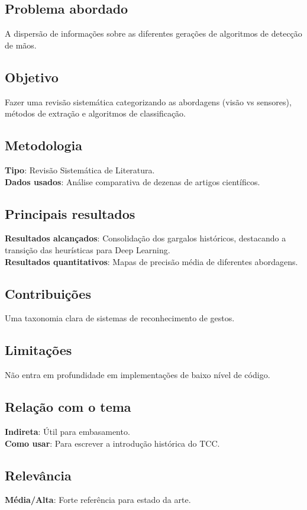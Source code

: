 \documentclass[12pt, a4paper]{article}
\begin{document}
\subsection{Problema abordado}
A dispersão de informações sobre as diferentes gerações de algoritmos de detecção de mãos.\\
\subsection{Objetivo}
Fazer uma revisão sistemática categorizando as abordagens (visão vs sensores), métodos de extração e algoritmos de classificação.\\
\subsection{Metodologia}
\textbf{Tipo}: Revisão Sistemática de Literatura.\\
\textbf{Dados usados}: Análise comparativa de dezenas de artigos científicos.\\
\subsection{Principais resultados}
\textbf{Resultados alcançados}: Consolidação dos gargalos históricos, destacando a transição das heurísticas para Deep Learning.\\
\textbf{Resultados quantitativos}: Mapas de precisão média de diferentes abordagens.\\
\subsection{Contribuições}
Uma taxonomia clara de sistemas de reconhecimento de gestos.\\
\subsection{Limitações}
Não entra em profundidade em implementações de baixo nível de código.\\
\subsection{Relação com o tema}
\textbf{Indireta}: Útil para embasamento.\\
\textbf{Como usar}: Para escrever a introdução histórica do TCC.\\
\subsection{Relevância}
\textbf{Média/Alta}: Forte referência para estado da arte.\\
\end{document}
